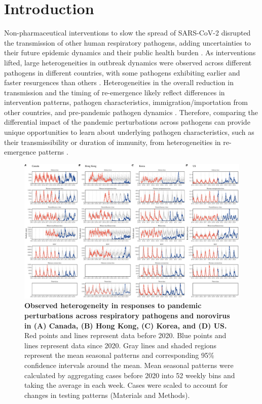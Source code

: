 \documentclass[12pt]{article}
\begin{document}
\pagebreak

\section*{Introduction}

Non-pharmaceutical interventions to slow the spread of SARS-CoV-2 disrupted the transmission of other human respiratory pathogens, adding uncertainties to their future epidemic dynamics and their public health burden \citep{baker2020impact}.
As interventions lifted, large heterogeneities in outbreak dynamics were observed across different pathogens in different countries, with some pathogens exhibiting earlier and faster resurgences than others \citep{gomez2021uncertain,koltai2022determinants,park2024predicting}.
Heterogeneities in the overall reduction in transmission and the timing of re-emergence likely reflect differences in intervention patterns, pathogen characteristics, immigration/importation from other countries, and pre-pandemic pathogen dynamics \citep{perofsky2024impacts}.
Therefore, comparing the differential impact of the pandemic perturbations across pathogens can provide unique opportunities to learn about underlying pathogen characteristics, such as their transmissibility or duration of immunity, from heterogeneities in re-emergence patterns \citep{chow2023effects}.

\begin{figure}[!th]
\includegraphics[width=\textwidth]{../figure1/figure1.pdf}
\caption{
\textbf{Observed heterogeneity in responses to pandemic perturbations across respiratory pathogens and norovirus in (A) Canada, (B) Hong Kong, (C) Korea, and (D) US.}
Red points and lines represent data before 2020.
Blue points and lines represent data since 2020.
Gray lines and shaded regions represent the mean seasonal patterns and corresponding 95\% confidence intervals around the mean.
Mean seasonal patterns were calculated by aggregating cases before 2020 into 52 weekly bins and taking the average in each week.
Cases were scaled to account for changes in testing patterns (Materials and Methods).
}
\end{figure} 
\end{document}
